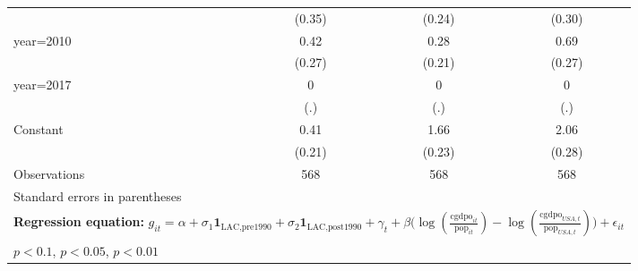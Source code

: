 \begin{table}[htbp]
\begin{tabular}{l*{3}{c}}
                &   (0.35)         &   (0.24)         &   (0.30)         \\
\addlinespace
year=2010       &     0.42         &     0.28         &     0.69\sym{**} \\
                &   (0.27)         &   (0.21)         &   (0.27)         \\
\addlinespace
year=2017       &        0         &        0         &        0         \\
                &      (.)         &      (.)         &      (.)         \\
\addlinespace
Constant        &     0.41\sym{*}  &     1.66\sym{***}&     2.06\sym{***}\\
                &   (0.21)         &   (0.23)         &   (0.28)         \\
\midrule
Observations    &      568         &      568         &      568         \\
\bottomrule
\multicolumn{4}{l}{\footnotesize Standard errors in parentheses}\\
\multicolumn{4}{l}{\footnotesize \textbf{Regression equation:} \(g_{it} = \alpha + \sigma_1 \mathbf{1}_{\textrm{LAC,pre1990}} + \sigma_2 \mathbf{1}_{\textrm{LAC,post1990}} + \gamma_t + \beta \big(\log (\frac{\textrm{cgdpo}_{it}}{\textrm{pop}_{it}} ) - \log (\frac{\textrm{cgdpo}_{USA,t}}{\textrm{pop}_{USA,t}}  ) \big) + \epsilon_{it}\)}\\
\multicolumn{4}{l}{\footnotesize \sym{*} \(p<0.1\), \sym{**} \(p<0.05\), \sym{***} \(p<0.01\)}\\
\end{tabular}
\end{table}
